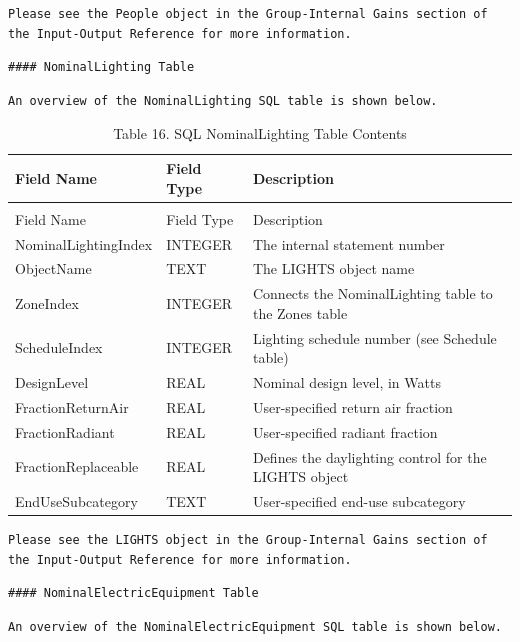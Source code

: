 \begin{lstlisting}
Please see the People object in the Group-Internal Gains section of the Input-Output Reference for more information.
\end{lstlisting}

\begin{lstlisting}
#### NominalLighting Table
\end{lstlisting}

\begin{lstlisting}
An overview of the NominalLighting SQL table is shown below.
\end{lstlisting}

\begin{longtable}[c]{p{1.5in}p{1.5in}p{3.0in}}
\caption{Table 16. SQL NominalLighting Table Contents \label{table:table-16.-sql-nominallighting-table-contents}} \tabularnewline
\toprule 
Field Name & Field Type & Description \tabularnewline
\midrule
\endfirsthead

\caption[]{Table 16. SQL NominalLighting Table Contents} \tabularnewline
\toprule 
Field Name & Field Type & Description \tabularnewline
\midrule
\endhead

NominalLightingIndex & INTEGER & The internal statement number \tabularnewline
ObjectName & TEXT & The LIGHTS object name \tabularnewline
ZoneIndex & INTEGER & Connects the NominalLighting table to the Zones table \tabularnewline
ScheduleIndex & INTEGER & Lighting schedule number (see Schedule table) \tabularnewline
DesignLevel & REAL & Nominal design level, in Watts \tabularnewline
FractionReturnAir & REAL & User-specified return air fraction \tabularnewline
FractionRadiant & REAL & User-specified radiant fraction \tabularnewline
FractionReplaceable & REAL & Defines the daylighting control for the LIGHTS object \tabularnewline
EndUseSubcategory & TEXT & User-specified end-use subcategory \tabularnewline
\bottomrule
\end{longtable}

\begin{lstlisting}
Please see the LIGHTS object in the Group-Internal Gains section of the Input-Output Reference for more information.
\end{lstlisting}

\begin{lstlisting}
#### NominalElectricEquipment Table
\end{lstlisting}

\begin{lstlisting}
An overview of the NominalElectricEquipment SQL table is shown below.
\end{lstlisting}

